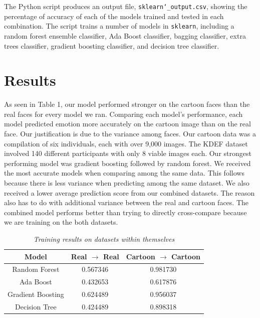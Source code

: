 \documentclass{Project}
\begin{document}
The Python script produces an output file, \texttt{sklearn\char`_outpu\-t.csv},
showing the percentage of accuracy of each of the models trained and tested in each
combination. The script trains a number of models in \texttt{sklearn},
including a random forest ensemble classifier, Ada Boost classifier, bagging
classifier, extra trees classifier, gradient boosting classifier, and decision
tree classifier.

\section{Results}

As seen in Table 1, our model performed stronger on the cartoon faces than the real faces for every model we ran. Comparing each model's performance, each model predicted emotion more accurately on the cartoon image than on the real face. Our justification is due to the variance among faces. Our cartoon data was a compilation of six individuals, each with over 9,000 images. The KDEF dataset involved 140 different participants with only 8 viable images each. Our strongest performing model was gradient boosting followed by random forest. We received the most accurate models when comparing among the same data. This follows because there is less variance when predicting among the same dataset. We also received a lower average prediction score from our combined datasets. The reason also has to do with additional variance between the real and cartoon faces. The combined model performs better than trying to directly cross-compare because we are training on the both datasets.
\begin{table}[h!]
\centering
\caption{\textit{Training results on datasets within themselves}}
\begin{tabular}{|c|c|c|} \hline
\textbf{Model}      & \textbf{Real $\rightarrow$ Real}  & \textbf{Cartoon $\rightarrow$ Cartoon}  \\\hline
Random Forest       & 0.567346                          & 0.981730  \\\hline
Ada Boost           & 0.432653                          & 0.617876  \\\hline
Gradient Boosting   & 0.624489                          & 0.956037  \\\hline
Decision Tree       & 0.424489                          & 0.898318  \\\hline
\end{tabular}
\end{table}
\end{document}
